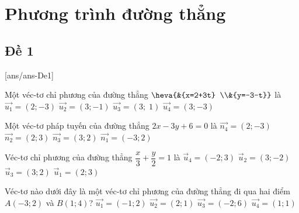 \section{Phương trình đường thẳng}

\subsection{Đề 1}
[ans/ans-De1]
\caulc
\begin{ex}%
	Một véc-tơ chỉ phương của đường thẳng $\heva{&{x=2+3t} \\&{y=-3-t}}$ là
	\choice
	{$\overrightarrow{u_1}=\left(2;-3\right)$}
	{\True $\overrightarrow{u_2}=\left(3;-1\right)$}
	{$\overrightarrow{u_3}=\left(3; \; 1\right)$}
	{$\overrightarrow{u_4}=\left(3;-3\right)$}
\end{ex}
\begin{ex}%
	Một véc-tơ pháp tuyến của đường thẳng $2x-3y+6=0$ là
	\choice
	{\True $\overrightarrow{n_4}=\left(2;-3\right)$}
	{$\overrightarrow{n_2}=\left(2; 3\right)$}
	{$\overrightarrow{n_3}=\left(3; 2\right)$}
	{$\overrightarrow{n_1}=\left(-3; 2\right)$}
\end{ex}
\begin{ex}%
	Véc-tơ chỉ phương của đường thẳng $\dfrac{x}{3}+\dfrac{y}{2}=1$ là
	\choice
	{$\overrightarrow{u}_4=\left(-2; 3\right)$}
	{\True $\overrightarrow{u}_2=\left(3;-2\right)$}
	{$\overrightarrow{u}_3=\left(3; 2\right)$}
	{$\overrightarrow{u}_1=\left(2; 3\right)$}
\end{ex}
\begin{ex}%
	Véc-tơ nào dưới đây là một véc-tơ chỉ phương của đường thẳng đi qua hai điểm $A\left(-3;2\right)$ và $B\left(1;4\right)$?
	\choice
	{$\overrightarrow{u_1}=\left(-1;2\right)$}
	{\True $\overrightarrow{u_2}=\left(2;1\right)$}
	{$\overrightarrow{u_3}=\left(-2;6\right)$}
	{$\overrightarrow{u_4}=\left(1;1\right)$}
\end{ex}
